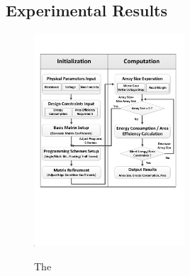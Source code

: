 \vspace{10pt}
\subsection{Experimental Results} \begin{figure}%
\centering
  \includegraphics[width=0.5\textwidth]{./figures/FlowChart.pdf}\\
  \caption{The}\label{fig:non_linear_A}
\end{figure}